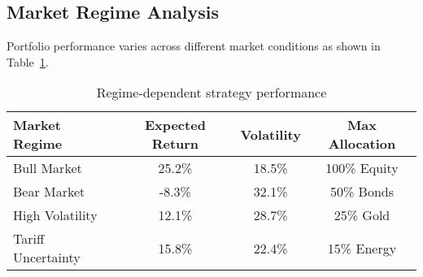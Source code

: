 \documentclass[11pt]{IEEEtran}
\begin{document}
\begin{multicols}{2}

\subsection{Market Regime Analysis}

Portfolio performance varies across different market conditions as shown in Table~\ref{tab:regimes}.

\end{multicols}

\begin{table}[h]
\centering
\begin{tabular}{lccc}
\toprule
Market Regime & Expected Return & Volatility & Max Allocation \\
\midrule
Bull Market & 25.2\% & 18.5\% & 100\% Equity \\
Bear Market & -8.3\% & 32.1\% & 50\% Bonds \\
High Volatility & 12.1\% & 28.7\% & 25\% Gold \\
Tariff Uncertainty & 15.8\% & 22.4\% & 15\% Energy \\
\bottomrule
\end{tabular}
\caption{Regime-dependent strategy performance}
\label{tab:regimes}
\end{table}
\end{document}
